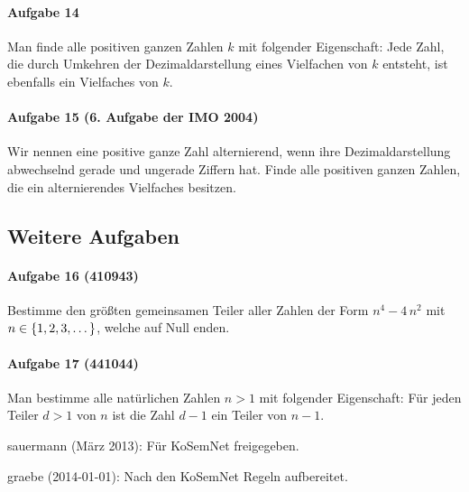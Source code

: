\documentclass[11pt,a4paper]{article}
\begin{document}
\paragraph{Aufgabe 14} 
Man finde alle positiven ganzen Zahlen $k$ mit folgender Eigenschaft: Jede
Zahl, die durch Umkehren der Dezimaldarstellung eines Vielfachen von $k$
entsteht, ist ebenfalls ein Vielfaches von $k$.

\paragraph{Aufgabe 15  (6. Aufgabe der IMO 2004)} 
Wir nennen eine positive ganze Zahl alternierend, wenn ihre Dezimaldarstellung
abwechselnd gerade und ungerade Ziffern hat. Finde alle positiven ganzen
Zahlen, die ein alternierendes Vielfaches besitzen.

\subsection*{Weitere Aufgaben}

\paragraph{Aufgabe 16 (410943)} 
Bestimme den größten gemeinsamen Teiler aller Zahlen der Form $n^{4}-4\,n^{2}$
mit $n\in\left\{1,2,3,\dots\right\}$, welche auf Null enden.

\paragraph{Aufgabe 17 (441044)} 
Man bestimme alle natürlichen Zahlen $n>1$ mit folgender Eigenschaft: Für
jeden Teiler $d>1$ von $n$ ist die Zahl $d-1$ ein Teiler von $n-1$.

\begin{attribution}
sauermann (März 2013): Für KoSemNet freigegeben.

graebe (2014-01-01): Nach den KoSemNet Regeln aufbereitet.
\end{attribution}
\end{document}
